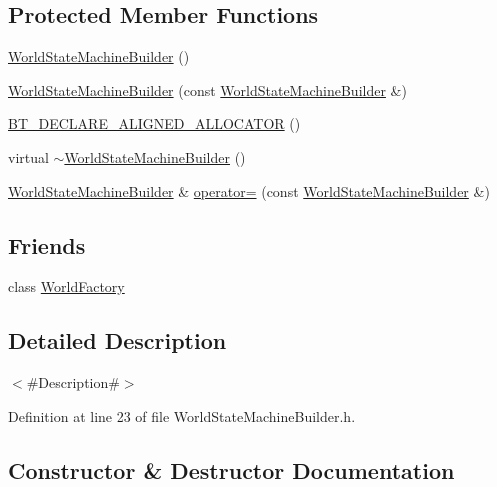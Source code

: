\subsection*{Protected Member Functions}
\begin{DoxyCompactItemize}
\item 
\mbox{\hyperlink{classnjli_1_1_world_state_machine_builder_a335dc89d4e7d99ba9c8bb4eb83b0d690}{World\+State\+Machine\+Builder}} ()
\item 
\mbox{\hyperlink{classnjli_1_1_world_state_machine_builder_a8af3314f1c7bbb35ffc91fcca6fb98a3}{World\+State\+Machine\+Builder}} (const \mbox{\hyperlink{classnjli_1_1_world_state_machine_builder}{World\+State\+Machine\+Builder}} \&)
\item 
\mbox{\hyperlink{classnjli_1_1_world_state_machine_builder_a87c06b98978431b165f3e5d2a95a86d4}{B\+T\+\_\+\+D\+E\+C\+L\+A\+R\+E\+\_\+\+A\+L\+I\+G\+N\+E\+D\+\_\+\+A\+L\+L\+O\+C\+A\+T\+OR}} ()
\item 
virtual \mbox{\hyperlink{classnjli_1_1_world_state_machine_builder_ae8e190fa3a0a4e749f7f1b9ae9280c12}{$\sim$\+World\+State\+Machine\+Builder}} ()
\item 
\mbox{\hyperlink{classnjli_1_1_world_state_machine_builder}{World\+State\+Machine\+Builder}} \& \mbox{\hyperlink{classnjli_1_1_world_state_machine_builder_a33cabbf4b869f923dbb385a99ef8bf9f}{operator=}} (const \mbox{\hyperlink{classnjli_1_1_world_state_machine_builder}{World\+State\+Machine\+Builder}} \&)
\end{DoxyCompactItemize}
\subsection*{Friends}
\begin{DoxyCompactItemize}
\item 
class \mbox{\hyperlink{classnjli_1_1_world_state_machine_builder_acb96ebb09abe8f2a37a915a842babfac}{World\+Factory}}
\end{DoxyCompactItemize}


\subsection{Detailed Description}
$<$\#\+Description\#$>$ 

Definition at line 23 of file World\+State\+Machine\+Builder.\+h.



\subsection{Constructor \& Destructor Documentation}
\mbox{\label{classnjli_1_1_world_state_machine_builder_a335dc89d4e7d99ba9c8bb4eb83b0d690}} 
